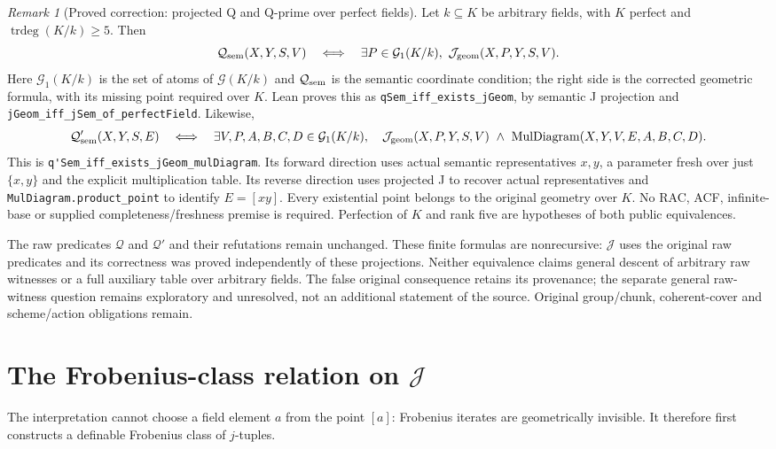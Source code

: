 \documentclass[11pt,oneside]{article}
\theoremstyle{definition}
\theoremstyle{remark}
\newtheorem{remark}[theorem]{Remark}
\newcommand{\G}{\mathcal{G}}
\newcommand{\Qrel}{\mathcal{Q}}
\newcommand{\Qprel}{\mathcal{Q}'}
\newcommand{\Jrel}{\mathcal{J}}
\newcommand{\lean}[1]{\nolinkurl{#1}}
\begin{document}
\begin{remark}[Proved correction: projected Q and Q-prime over perfect fields]
\label{rem:projected-q-correction}
Let $k\subseteq K$ be arbitrary fields, with $K$ perfect and
$\operatorname{trdeg}(K/k)\geq5$. Then
\[
 \Qrel_{\rm sem}(X,Y,S,V)\quad\Longleftrightarrow\quad
 \exists P\in\mathcal G_1(K/k),\ \Jrel_{\rm geom}(X,P,Y,S,V).
\]
Here $\mathcal G_1(K/k)$ is the set of atoms of $\G(K/k)$ and $\Qrel_{\rm sem}$ is the
semantic coordinate condition; the right side is the corrected
geometric formula, with its missing point required over $K$. Lean proves this as
\lean{qSem_iff_exists_jGeom}, by semantic J projection and
\lean{jGeom_iff_jSem_of_perfectField}. Likewise,
\[
 \Qprel_{\rm sem}(X,Y,S,E)\quad\Longleftrightarrow\quad
 \exists V,P,A,B,C,D\in\mathcal G_1(K/k),\quad
 \Jrel_{\rm geom}(X,P,Y,S,V)\ \wedge\ \operatorname{MulDiagram}(X,Y,V,E,A,B,C,D).
\]
This is \lean{q'Sem_iff_exists_jGeom_mulDiagram}. Its forward direction uses actual
semantic representatives $x,y$, a parameter fresh over just $\{x,y\}$ and the explicit
multiplication table. Its reverse direction uses projected J to recover actual
representatives and \lean{MulDiagram.product_point} to identify $E=[xy]$.
Every existential point belongs to the original geometry over $K$. No RAC, ACF,
infinite-base or supplied completeness/freshness premise is required. Perfection of $K$
and rank five are hypotheses of both public equivalences.

The raw predicates $\Qrel$ and $\Qprel$ and their refutations remain unchanged. These
finite formulas are nonrecursive: $\Jrel$ uses the original raw predicates and its
correctness was proved independently of these projections. Neither equivalence claims
general descent of arbitrary raw witnesses or a full auxiliary table over arbitrary
fields. The false original consequence retains its provenance; the separate general
raw-witness question remains exploratory and unresolved, not an additional statement
of the source. Original group/chunk, coherent-cover and scheme/action obligations remain.
\end{remark}

\section[The Frobenius-class relation on J]
{The Frobenius-class relation on $\Jrel$}

The interpretation cannot choose a field element $a$ from the point $[a]$: Frobenius
iterates are geometrically invisible.  It therefore first constructs a definable
Frobenius class of $j$-tuples.
\end{document}

